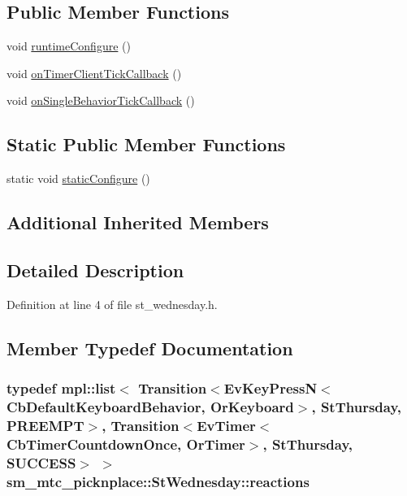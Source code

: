\subsection*{Public Member Functions}
\begin{DoxyCompactItemize}
\item 
void \hyperlink{structsm__mtc__picknplace_1_1StWednesday_af8f9eba05b5aa1c6935aa7521c0e0aea}{runtime\+Configure} ()
\item 
void \hyperlink{structsm__mtc__picknplace_1_1StWednesday_a7637a31db7c90caf135946e29fce646e}{on\+Timer\+Client\+Tick\+Callback} ()
\item 
void \hyperlink{structsm__mtc__picknplace_1_1StWednesday_ae04e24917dfd986eb1ba7354b6fb3a4c}{on\+Single\+Behavior\+Tick\+Callback} ()
\end{DoxyCompactItemize}
\subsection*{Static Public Member Functions}
\begin{DoxyCompactItemize}
\item 
static void \hyperlink{structsm__mtc__picknplace_1_1StWednesday_afb292b077b88953bd894c6dbaa4e5cb1}{static\+Configure} ()
\end{DoxyCompactItemize}
\subsection*{Additional Inherited Members}


\subsection{Detailed Description}


Definition at line 4 of file st\+\_\+wednesday.\+h.



\subsection{Member Typedef Documentation}
\subsubsection[{\texorpdfstring{reactions}{reactions}}]{\setlength{\rightskip}{0pt plus 5cm}typedef mpl\+::list$<$ Transition$<$Ev\+Key\+PressN$<$Cb\+Default\+Keyboard\+Behavior, {\bf Or\+Keyboard}$>$, {\bf St\+Thursday}, {\bf P\+R\+E\+E\+M\+PT}$>$, Transition$<$Ev\+Timer$<$Cb\+Timer\+Countdown\+Once, {\bf Or\+Timer}$>$, {\bf St\+Thursday}, {\bf S\+U\+C\+C\+E\+SS}$>$ $>$ {\bf sm\+\_\+mtc\+\_\+picknplace\+::\+St\+Wednesday\+::reactions}}\hypertarget{structsm__mtc__picknplace_1_1StWednesday_ad46b9202ae7fd4e050d6dfc3452d3119}{}\label{structsm__mtc__picknplace_1_1StWednesday_ad46b9202ae7fd4e050d6dfc3452d3119}


